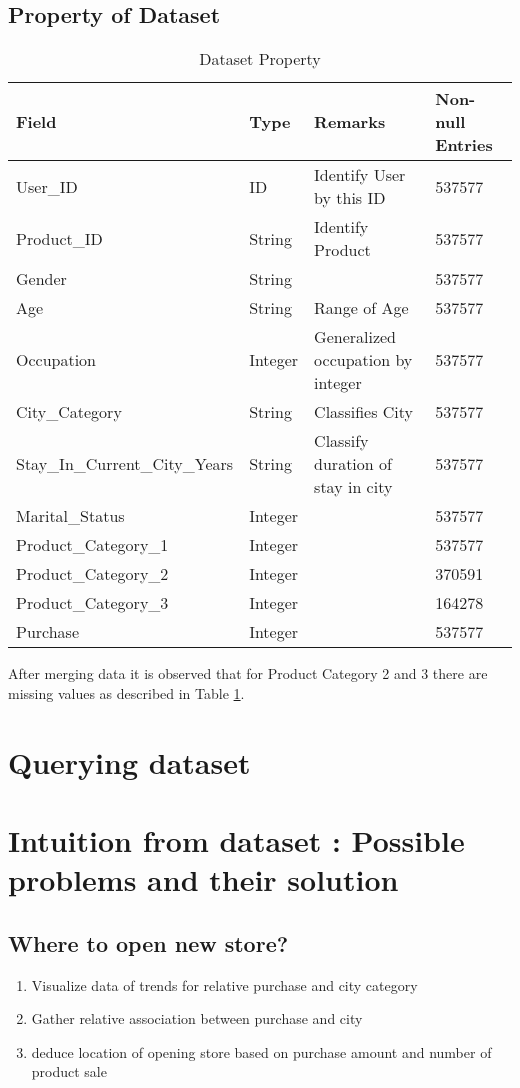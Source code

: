 \documentclass[paper=letter, fontsize=12pt]{article}
\begin{document}
\subsection{Property of Dataset}
\begin{table}[H]
	\centering
	\begin{tabular}{l  l  l  l}
		Field & Type & Remarks & Non-null Entries
		\\ \hline \hline
		User\_ID & ID & Identify User by this ID & 537577
		\\
		Product\_ID & String & Identify Product & 537577
		\\
		Gender & String &  & 537577
		\\
		Age & String & Range of Age & 537577
		\\
		Occupation & Integer & Generalized occupation by integer & 537577
		\\
		City\_Category & String & Classifies City & 537577
		\\
		Stay\_In\_Current\_City\_Years & String & Classify duration of stay in city & 537577
		\\
		Marital\_Status & Integer &  & 537577
		\\
		Product\_Category\_1 & Integer &  & 537577
		\\
		Product\_Category\_2 & Integer &  & 370591
		\\
		Product\_Category\_3 & Integer &  & 164278
		\\
		Purchase & Integer &  & 537577
	\end{tabular}
    \caption{Dataset Property}
    \label{table:data-observation}
\end{table}

After merging data it is observed that for Product Category 2 and 3 there are missing values as described in Table \ref{table:data-observation}.

\section{Querying dataset}



\section{Intuition from dataset : Possible problems and their solution}
\subsection{Where to open new store?}
\begin{enumerate}
	\item Visualize data of trends for relative purchase and city category
	\item Gather relative association between purchase and city
	\item deduce location of opening store based on purchase amount and number of product sale
\end{enumerate}
\end{document}
